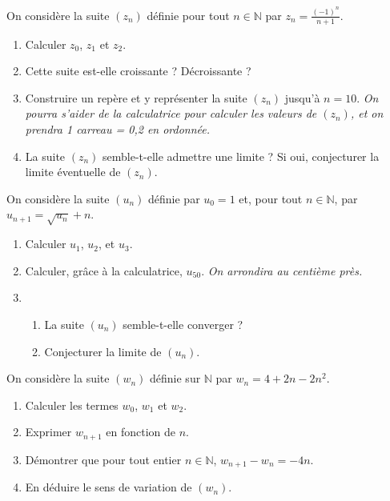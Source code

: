 \documentclass[11pt]{article}
\begin{document}
\begin{exo}[$2$ points]
  On considère la suite $(z_n)$ définie pour tout $n\in\mathbb{N}$ par
  $z_n=\frac{(-1)^n}{n+1}$.
  \begin{enumerate}
    \item Calculer $z_0$, $z_1$ et $z_2$.
    \item Cette suite est-elle croissante ? Décroissante ?
    \item Construire un repère et y représenter la suite $(z_n)$ jusqu'à $n=10$.
      \emph{On pourra s'aider de la calculatrice pour calculer les valeurs de
      $(z_n)$, et on prendra 1 carreau = 0,2 en ordonnée.}
    \item La suite $(z_n)$ semble-t-elle admettre une limite ? Si oui,
      conjecturer la limite éventuelle de $(z_n)$.
  \end{enumerate}
\end{exo}

\vspace{2cm}\setcounter{exo}{0}

\begin{exo}[$2$ points]
  On considère la suite $(u_n)$ définie par $u_0=1$ et, pour tout
  $n\in\mathbb{N}$, par $u_{n+1}=\sqrt{u_n}+n$.
  \begin{enumerate}
    \item Calculer $u_1$, $u_2$, et $u_3$.
    \item Calculer, gr\^ace à la calculatrice, $u_{50}$. \emph{On arrondira au
      centième près.}
    \item \begin{enumerate}
        \item La suite $(u_n)$ semble-t-elle converger ?
        \item Conjecturer la limite de $(u_n)$.
      \end{enumerate}
  \end{enumerate}
\end{exo}

\begin{exo}[$3$ points]
  On considère la suite $(w_n)$ définie sur $\mathbb{N}$ par $w_n=4+2n-2n^2$.
  \begin{enumerate}
    \item Calculer les termes $w_0$, $w_1$ et $w_2$.
    \item Exprimer $w_{n+1}$ en fonction de $n$.
    \item Démontrer que pour tout entier $n\in\mathbb{N}$, $w_{n+1}-w_n=-4n$.
    \item En déduire le sens de variation de $(w_n)$.
  \end{enumerate}
\end{exo}
\end{document}
